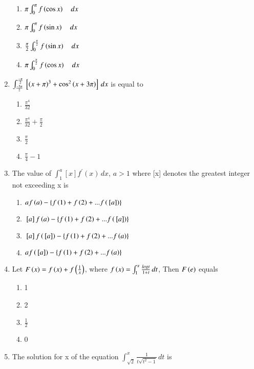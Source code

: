 \documentclass[journal]{IEEEtran}
\begin{document}
\begin{enumerate}
\begin{enumerate}
		         \item $\pi \int_{0}^{\pi} f\left(\cos x\right) \quad dx$
		         \item $\pi \int_{0}^{\pi} f\left(\sin x\right) \quad dx$
		         \item $\frac{\pi}{2} \int_{0}^{\frac{\pi}{2}} f\left(\sin x\right) \quad dx$
		         \item $\pi \int_{0}^{\frac{\pi}{2}} f\left(\cos x\right) \quad dx$
		    \end{enumerate}
	     \item
		    $\int_{\frac{-3\pi}{2}}^{\frac{-\pi}{2}} {}\left[\left(x+\pi\right)^{3}+\cos^{2}\left(x+3\pi\right)\right] \,dx$ is equal to
		    \hfill {} 
		   \begin{enumerate}
		        \item $\frac{\pi^{4}}{32}$
		        \item $\frac{\pi^{4}}{32}+\frac{\pi}{2}$
		        \item $\frac{\pi}{2}$
		        \item $\frac{\pi}{4}-1$
		   \end{enumerate}
	    \item
		    The value of $\int_{1}^{a} [x]f^{'}(x) \,dx$, $a>1$ where [x] denotes the greatest integer not exceeding x is
		   \hfill {}
		   \begin{enumerate}
		       \item $af\left(a\right)-\left\{f\left(1\right)+f\left(2\right)+...f\left({}\left[a\right]\right)\right\}$
		       \item ${}\left[a\right]f\left(a\right)-\left\{f\left(1\right)+f\left(2\right)+...f\left({}\left[a\right]\right)\right\}$
		       \item ${}\left[a\right]f\left({}\left[a\right]\right)-\left\{f\left(1\right)+f\left(2\right)+...f\left(a\right)\right\}$
		       \item $af\left({}\left[a\right]\right)-\left\{f\left(1\right)+f\left(2\right)+...f\left(a\right)\right\}$
		   \end{enumerate}
	   \item 
		    Let $F\left(x\right)=f\left(x\right)+f\left(\frac{1}{x}\right)$, where $f\left(x\right)=\int_{1}^{x} \frac{logt}{1+t} \,dt$, Then $F\left(e\right)$ equals
		    \hfill {} 
		   \begin{enumerate}
		      \item 1
		      \item 2
		      \item $\frac{1}{2}$
		      \item 0
		   \end{enumerate}  
	   \item 
    		    The solution for x of the equation $\int_{\sqrt2}^{x} \frac{1}{t\sqrt{t^{2}-1}} \,dt$ is

\end{enumerate}
\end{document}
